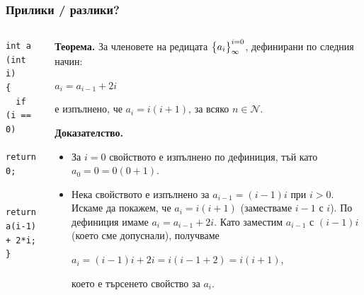 \documentclass{beamer}
\begin{document}
\begin{frame}[fragile]
\frametitle{Прилики / разлики?}



\begin{columns}[t]
  \begin{column}{0.5\textwidth}
\begin{lstlisting}
int a (int i)
{
  if (i == 0)
    return 0;

  return a(i-1) + 2*i;
}

\end{lstlisting}
  \end{column}
  \begin{column}{0.5\textwidth}
\begin{flushleft}
\textbf{Теорема.} За членовете на редицата $\big{\{}a_i\big{\}}_\infty^{i=0}$, дефинирани по следния начин:

\vspace{10px}
$a_i = a_{i-1} + 2i$
\vspace{10px}

е изпълнено, че $a_i=i(i+1)$, за всяко $n \in \mathcal{N}$.

\vspace{10px}


\textbf{Доказателство.}

\begin{itemize}
  \item За $i=0$ свойството е изпълнено по дефиниция, тъй като $a_0=0=0(0+1)$.
  \item Нека свойството е изпълнено за $a_{i-1}=(i-1)i$ при $i > 0$. Искаме да покажем, че $a_i=i(i+1)$ (заместваме $i-1$ с $i$). По дефиниция имаме $a_{i} = a_{i-1} + 2i$. Като заместим $a_{i-1}$ с $(i-1)i$ (което сме допуснали), получваме

  $a_{i} = (i-1)i + 2i = i(i-1+2)=i(i+1)$,

  което е търсенето свойство за $a_{i}$.
\end{itemize}

\end{flushleft}


  \end{column}
\end{columns}


\end{frame}
\end{document}
